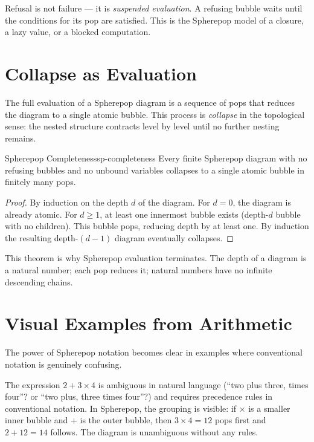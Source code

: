 Refusal is not failure — it is \emph{suspended evaluation}. A refusing
bubble waits until the conditions for its pop are satisfied. This is the
Spherepop model of a closure, a lazy value, or a blocked computation.

\section{Collapse as Evaluation}

The full evaluation of a Spherepop diagram is a sequence of pops that
reduces the diagram to a single atomic bubble. This process is
\emph{collapse} in the topological sense: the nested structure contracts
level by level until no further nesting remains.

\begin{theorem}{Spherepop Completeness}{sp-completeness}
  Every finite Spherepop diagram with no refusing bubbles and no
  unbound variables collapses to a single atomic bubble in finitely
  many pops.
\end{theorem}

\begin{proof}
  By induction on the depth $d$ of the diagram. For $d = 0$, the
  diagram is already atomic. For $d \geq 1$, at least one innermost
  bubble exists (depth-$d$ bubble with no children). This bubble pops,
  reducing depth by at least one. By induction the resulting depth-$(d-1)$
  diagram eventually collapses.
\end{proof}

This theorem is why Spherepop evaluation terminates. The depth of a diagram
is a natural number; each pop reduces it; natural numbers have no infinite
descending chains.

\section{Visual Examples from Arithmetic}

The power of Spherepop notation becomes clear in examples where conventional
notation is genuinely confusing.

\begin{example}[title={Order of operations}]
  The expression $2 + 3 \times 4$ is ambiguous in natural language
  (``two plus three, times four''? or ``two plus, three times four''?)
  and requires precedence rules in conventional notation. In Spherepop,
  the grouping is visible: if $\times$ is a smaller inner bubble and
  $+$ is the outer bubble, then $3 \times 4 = 12$ pops first and
  $2 + 12 = 14$ follows. The diagram is unambiguous without any rules.
\end{example}

